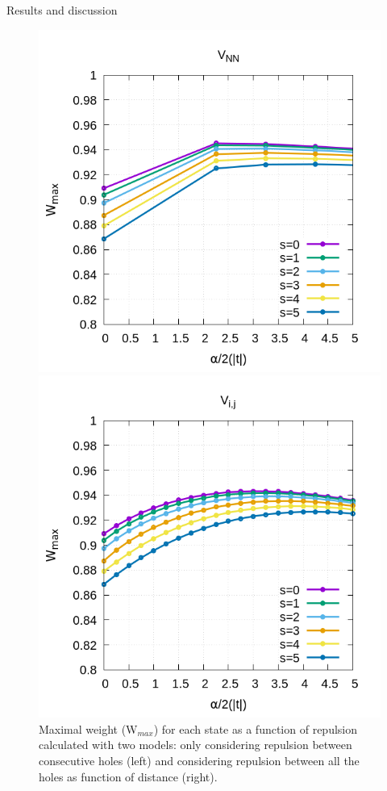 \documentclass[12pt,twoside]{report}
\begin{document}
\begin{chapter}{Results and discussion}
	\begin{figure}[h!]
		\centering
		\hspace{-2cm}
		\begin{minipage}{0.4\textwidth}
			\includegraphics[scale=0.3]{Wmax_vs_xrep0v1.png}
		\end{minipage}
		\hspace{2cm}
		\begin{minipage}{0.4\textwidth}
			\includegraphics[scale=0.3]{Wmax_vs_xrep0vn.png}
		\end{minipage}
		\caption{\label{fig_v1n} Maximal weight (W$_{max}$) for each state as a function of repulsion calculated with two models: only considering repulsion between consecutive holes (left) and considering repulsion between all the holes as function of distance (right). }
	\end{figure}
	

\end{chapter}
\end{document}
